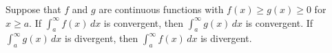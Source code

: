\begin{theorem}
    Suppose that \(f\) and \(g\) are continuous functions with
    \(f(x)\geq g(x)\geq 0\) for \(x\geq a\).
    If \(\displaystyle{\int_a^\infty f(x)\,dx}\) is convergent, then
    \(\displaystyle{\int_a^\infty g(x)\,dx}\) is convergent.
    If \(\displaystyle{\int_a^\infty g(x)\,dx}\) is divergent, then
    \(\displaystyle{\int_a^\infty f(x)\,dx}\) is divergent.
\end{theorem}